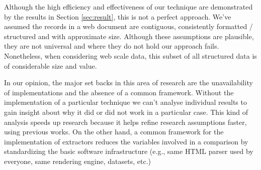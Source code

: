 \documentclass{vldb}
\begin{document}
Although the high efficiency and effectiveness of our technique are demonstrated
by the results in Section \ref{sec:result}, this is not a perfect approach. We've
assumed the records in a web document are contiguous, consistently
formatted / structured and with approximate size. Although these assumptions are
plausible, they are not universal and where they do not hold our approach fails.
Nonetheless, when considering web scale data, this subset of all structured data
is of considerable size and value.

In our opinion, the major set backs in this area of research are the
unavailability of implementations and the absence of a common framework.
Without the implementation of a particular technique we can't analyse individual
results to gain insight about why it did or did not work in a particular case.
This kind of analysis speeds up research because it helps refine research
assumptions faster, using previous works. On the other hand, a common framework
for the implementation of extractors reduces the variables involved in a
comparison by standardizing the basic software infrastructure (e.g., same HTML
parser used by everyone, same rendering engine, datasets, etc.)
 
\end{document}
